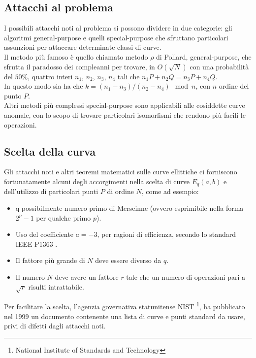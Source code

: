 \documentclass{article}
\begin{document}
	\subsection{Attacchi al problema}
	
	I possibili attacchi noti al problema si possono dividere in due categorie:
	gli algoritmi general-purpose e	quelli special-purpose che sfruttano particolari assunzioni per attaccare determinate classi di curve.\\
	
	Il metodo più famoso è quello chiamato metodo $\rho$ di Pollard, general-purpose, che sfrutta il paradosso dei compleanni per trovare, in $O(\sqrt{N})$ con una probabilità del $50\%$,
	quattro interi $n_{1}$, $n_{2}$, $n_{3}$, $n_{4}$ tali che $n_{1}P + n_{2}Q = n_{3}P + n_{4}Q$.\\ 
	In questo modo sia ha che $k = (n_{1} - n_{3}) / (n_{2} - n_{4}) \mod n$, con $n$ ordine del punto $P$.\\
	
	Altri metodi più complessi special-purpose sono applicabili alle cosiddette curve anomale, 
	con lo scopo di trovare particolari isomorfismi che rendono più facili le operazioni.
	
	\subsection{Scelta della curva}
	
	Gli attacchi noti e altri teoremi matematici sulle curve ellittiche
	ci forniscono fortunatamente alcuni degli accorgimenti \cite{Sec2} nella scelta
	di curve $E_{q}(a,b)$ e dell'utilizzo di particolari punti $P$ di ordine $N$,
	come ad esempio: 
	
	\begin{itemize}
		\item q possibilmente numero primo di Merseinne (ovvero esprimibile nella forma $2^{p}-1$ per qualche primo $p$).
		\item Uso del coefficiente $a = -3$, per ragioni di efficienza, secondo lo standard IEEE P1363 \cite{P1363}.
		\item Il fattore più grande di $N$ deve essere diverso da $q$.
		\item Il numero $N$ deve avere un fattore $r$ tale che un numero di operazioni pari a $\sqrt{r}$ risulti intrattabile.
	\end{itemize}
	
	Per facilitare la scelta, l'agenzia governativa statunitense NIST \footnote{National Institute of Standards and Technology},
	ha pubblicato nel 1999 un documento \cite{NIST} contenente una lista di curve e punti standard da usare,
	privi di difetti dagli attacchi noti. 
	
\end{document}
